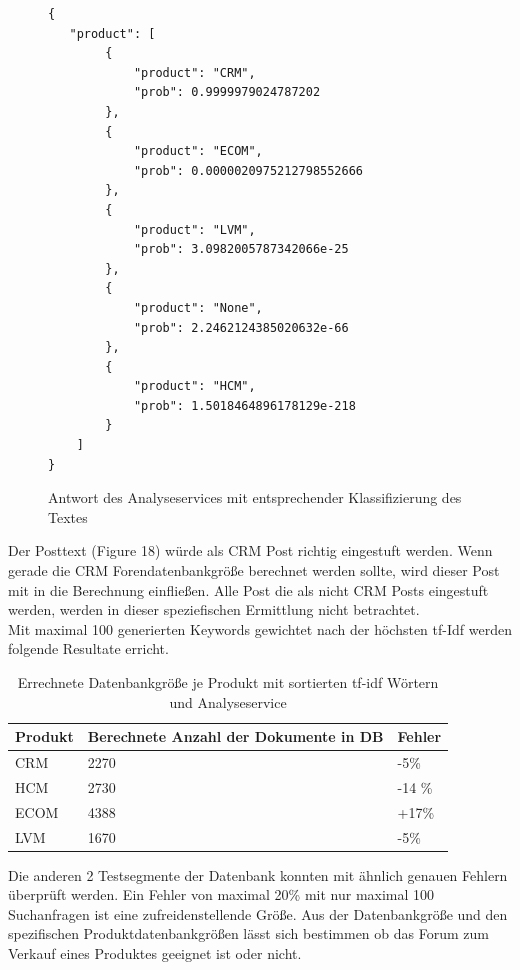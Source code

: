 \newpage

\begin{figure}[h!]
\begin{lstlisting}[language=HTML5]
{
   "product": [
        {
            "product": "CRM",
            "prob": 0.9999979024787202
        },
        {
            "product": "ECOM",
            "prob": 0.0000020975212798552666
        },
        {
            "product": "LVM",
            "prob": 3.0982005787342066e-25
        },
        {
            "product": "None",
            "prob": 2.2462124385020632e-66
        },
        {
            "product": "HCM",
            "prob": 1.5018464896178129e-218
        }
    ]
}
\end{lstlisting}
\caption{Antwort des Analyseservices mit entsprechender Klassifizierung des Textes}
\end{figure}

Der Posttext (Figure 18) würde als CRM Post richtig eingestuft werden. Wenn gerade die CRM Forendatenbankgröße berechnet werden sollte, wird dieser Post mit in die Berechnung einfließen. Alle Post die als nicht CRM Posts eingestuft werden, werden in dieser speziefischen Ermittlung nicht betrachtet.\\
Mit maximal 100 generierten Keywords gewichtet nach der höchsten tf-Idf werden folgende Resultate erricht.

\begin{table}
\begin{tabular}{ | p{3cm} | l | l |}
\hline
Produkt & Berechnete Anzahl der Dokumente in DB & Fehler \\ \hline
CRM & 2270 & -5\% \\ \hline
HCM & 2730 & -14 \% \\ \hline
ECOM & 4388 & +17\% \\ \hline
LVM & 1670 & -5\% \\ \hline
\end{tabular}
\caption{Errechnete Datenbankgröße je Produkt mit sortierten tf-idf Wörtern und Analyseservice}
\end{table}

Die anderen 2 Testsegmente der Datenbank konnten mit ähnlich genauen Fehlern überprüft werden.
Ein Fehler von maximal 20\% mit nur maximal 100 Suchanfragen ist eine zufreidenstellende Größe. Aus der Datenbankgröße und den spezifischen Produktdatenbankgrößen lässt sich bestimmen ob das Forum zum Verkauf eines Produktes geeignet ist oder nicht.